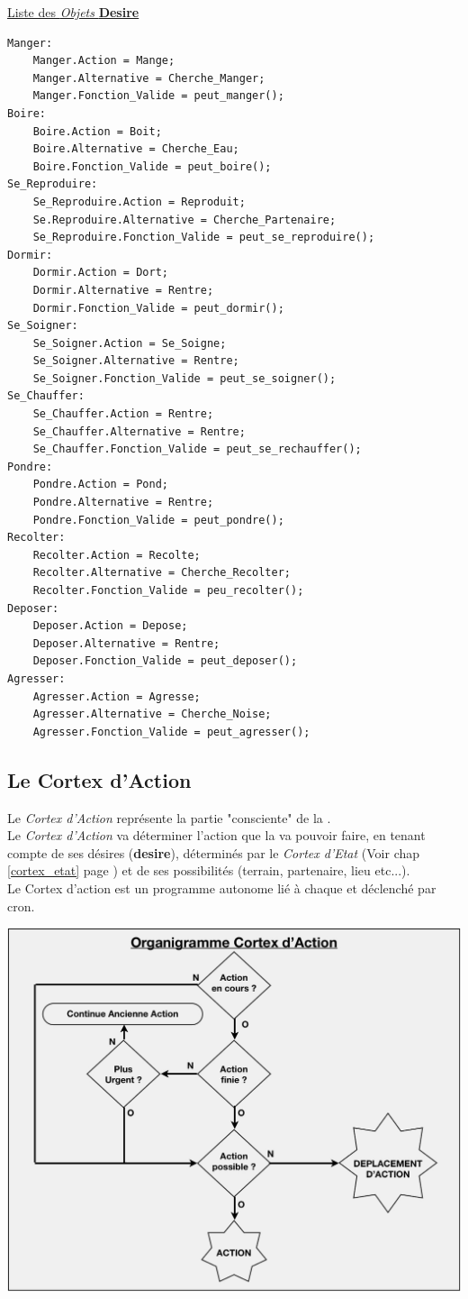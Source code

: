 \documentclass[french]{report}
\newlength{\du}\fi
\begin{document}
\underline{Liste des \textit{Objets} \textbf{Desire}}
\begin{lstlisting}
Manger:
	Manger.Action = Mange;
	Manger.Alternative = Cherche_Manger;
	Manger.Fonction_Valide = peut_manger();
Boire:
	Boire.Action = Boit;
	Boire.Alternative = Cherche_Eau;
	Boire.Fonction_Valide = peut_boire();
Se_Reproduire:
	Se_Reproduire.Action = Reproduit;
	Se.Reproduire.Alternative = Cherche_Partenaire;
	Se_Reproduire.Fonction_Valide = peut_se_reproduire();
Dormir:
	Dormir.Action = Dort;
	Dormir.Alternative = Rentre;
	Dormir.Fonction_Valide = peut_dormir();
Se_Soigner:	
	Se_Soigner.Action = Se_Soigne;
	Se_Soigner.Alternative = Rentre;
	Se_Soigner.Fonction_Valide = peut_se_soigner();
Se_Chauffer:	
	Se_Chauffer.Action = Rentre;
	Se_Chauffer.Alternative = Rentre;
	Se_Chauffer.Fonction_Valide = peut_se_rechauffer();
Pondre:	
	Pondre.Action = Pond;
	Pondre.Alternative = Rentre;
	Pondre.Fonction_Valide = peut_pondre();
Recolter:	
	Recolter.Action = Recolte;
	Recolter.Alternative = Cherche_Recolter;
	Recolter.Fonction_Valide = peu_recolter();
Deposer:	
	Deposer.Action = Depose;
	Deposer.Alternative = Rentre;
	Deposer.Fonction_Valide = peut_deposer();
Agresser:	
	Agresser.Action = Agresse;
	Agresser.Alternative = Cherche_Noise;
	Agresser.Fonction_Valide = peut_agresser();		
\end{lstlisting}	


\newpage

\subsection{Le Cortex d'Action}\label{cortex_action}

Le \textit{Cortex d'Action} représente la partie "consciente" de la \CoCiX.\\
Le \textit{Cortex d'Action} va déterminer l'action que la \CoCiX va pouvoir faire, en tenant compte de ses désires (\textbf{desire}), déterminés par le \textit{Cortex d'Etat} (Voir chap \ref{cortex_etat} page \pageref{cortex_etat}) et de ses possibilités (terrain, partenaire, lieu etc...).\\

Le Cortex d'action est un programme autonome lié à chaque \CoCiX et déclenché par cron.\\

\begin{center}
	\includegraphics[width=0.8\linewidth]{images/cortex_action.jpg}
\end{center}
\end{document}

